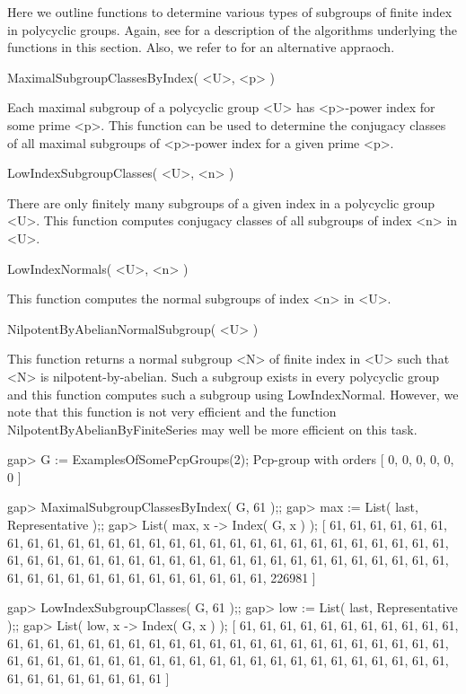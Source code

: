 Here we outline functions to determine various types of subgroups of 
finite index in polycyclic groups. Again, see \cite{Eic00} for a 
description of the algorithms underlying the functions in this section.
Also, we refer to \cite{Lo99} for an alternative appraoch.

\> MaximalSubgroupClassesByIndex( <U>, <p> )

Each maximal subgroup of a polycyclic group <U> has <p>-power index for
some prime <p>. This function can be used to determine the conjugacy 
classes of all maximal subgroups of <p>-power index for a given prime <p>.

\>LowIndexSubgroupClasses( <U>, <n> )

There are only finitely many subgroups of a given index in a polycyclic
group <U>. This function computes conjugacy classes of all subgroups of 
index <n> in <U>.

\>LowIndexNormals( <U>, <n> )

This function computes the normal subgroups of index <n> in <U>. 

\>NilpotentByAbelianNormalSubgroup( <U> )

This function returns a normal subgroup <N> of finite index in <U> such 
that <N> is nilpotent-by-abelian. Such a subgroup exists in every polycyclic 
group and this function computes such a subgroup using LowIndexNormal. 
However, we note that this function is not very efficient and the function
NilpotentByAbelianByFiniteSeries may well be more efficient on this task.

\beginexample
gap> G := ExamplesOfSomePcpGroups(2);
Pcp-group with orders [ 0, 0, 0, 0, 0, 0 ]

gap> MaximalSubgroupClassesByIndex( G, 61 );;
gap> max := List( last, Representative );;
gap> List( max, x -> Index( G, x ) );
[ 61, 61, 61, 61, 61, 61, 61, 61, 61, 61, 61, 61, 61, 61, 61, 61, 61, 61, 61,
  61, 61, 61, 61, 61, 61, 61, 61, 61, 61, 61, 61, 61, 61, 61, 61, 61, 61, 61,
  61, 61, 61, 61, 61, 61, 61, 61, 61, 61, 61, 61, 61, 61, 61, 61, 61, 61, 61,
  61, 61, 61, 61, 61, 61, 226981 ]

gap> LowIndexSubgroupClasses( G, 61 );;
gap> low := List( last, Representative );;
gap> List( low, x -> Index( G, x ) );
[ 61, 61, 61, 61, 61, 61, 61, 61, 61, 61, 61, 61, 61, 61, 61, 61, 61, 61, 61,
  61, 61, 61, 61, 61, 61, 61, 61, 61, 61, 61, 61, 61, 61, 61, 61, 61, 61, 61,
  61, 61, 61, 61, 61, 61, 61, 61, 61, 61, 61, 61, 61, 61, 61, 61, 61, 61, 61,
  61, 61, 61, 61, 61, 61 ]
\endexample

